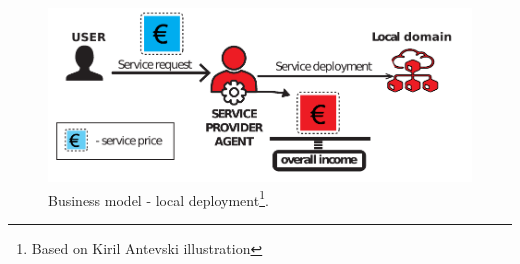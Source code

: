\documentclass[aspectratio=169]{beamer}
\begin{document}
\begin{frame}
    \frametitle{\secname}
    \framesubtitle{\subsecname}

    \begin{figure}
        \centering
        \includegraphics[width=.8\textwidth]{img/local-deploy.pdf}
        \caption{Business model - local deployment\footnote{Based on Kiril Antevski illustration}.}
        \label{fig:local-deploy}
    \end{figure}
\end{frame}
\end{document}
